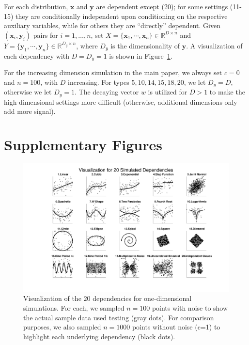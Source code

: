 \documentclass[11pt]{article}
\providecommand{\mb}[1]{\boldsymbol{#1}}
\newcommand{\Real}{\mathbb{R}}
\newcommand{\mby}{\ensuremath{\mb{y}}}
\begin{document}
For each distribution, $\mb{x}$ and $\mb{y}$ are dependent except  (20); for some settings (11-15) they are conditionally independent upon conditioning on the respective auxiliary variables, while for others they are
 ``directly'' dependent. 
 Given $(\mb{x}_{i},\mb{y}_{i})$ pairs for $i=1,\ldots,n$, set $X=\{\mb{x}_{1},\cdots, \mb{x}_{n}\} \in \Real^{D \times n}$ and $Y=\{\mb{y}_{1},\cdots, \mb{y}_{n}\} \in \Real^{D_y \times n}$, where $D_y$ is the dimensionality of \mby. A visualization of each dependency with $D=D_y=1$ is shown in Figure~\ref{f:dependencies}.


For the increasing dimension simulation in the main paper, we always set $c=0$ and $n=100$, with $D$ increasing.  For types  $5,10,14,15,18,20$, we let $D_y=D$, otherwise we let $D_y=1$. 
The decaying vector $w$ is utilized for $D>1$ to make the high-dimensional settings more difficult (otherwise, additional dimensions only add more signal).


\section{Supplementary Figures}
\label{appen:figs}





\begin{figure}[htbp]
\includegraphics[trim={5cm 0 3.5cm 0},clip, width=1.0\textwidth]{../Figures/FigSimVisual}
\caption{Visualization of the $20$ dependencies for one-dimensional simulations. For each, we sampled $n=100$ points with noise to show the actual sample data used testing (gray dots). For comparison purposes, we also sampled $n=1000$ points without noise (c=1) to highlight each underlying dependency (black dots).
}
\label{f:dependencies}
\end{figure}
\end{document}
